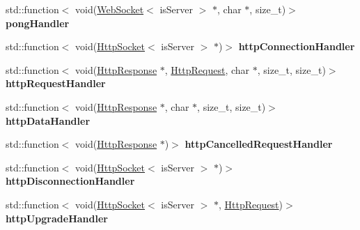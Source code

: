 \begin{DoxyCompactItemize}
\item 
\mbox{\label{structu_w_s_1_1_group_a5f782ed3edcd17723fd8a26e4b40abfd}} 
std\+::function$<$ void(\mbox{\hyperlink{structu_w_s_1_1_web_socket}{Web\+Socket}}$<$ is\+Server $>$ $\ast$, char $\ast$, size\+\_\+t)$>$ {\bfseries pong\+Handler}
\item 
\mbox{\label{structu_w_s_1_1_group_a697bf4ea6b46105c1e942d721b87e523}} 
std\+::function$<$ void(\mbox{\hyperlink{structu_w_s_1_1_http_socket}{Http\+Socket}}$<$ is\+Server $>$ $\ast$)$>$ {\bfseries http\+Connection\+Handler}
\item 
\mbox{\label{structu_w_s_1_1_group_acbaa06442c29bcd392ca748090d3eeba}} 
std\+::function$<$ void(\mbox{\hyperlink{structu_w_s_1_1_http_response}{Http\+Response}} $\ast$, \mbox{\hyperlink{structu_w_s_1_1_http_request}{Http\+Request}}, char $\ast$, size\+\_\+t, size\+\_\+t)$>$ {\bfseries http\+Request\+Handler}
\item 
\mbox{\label{structu_w_s_1_1_group_a4c3dc4b1a42a1304c2a85cea6545cc6c}} 
std\+::function$<$ void(\mbox{\hyperlink{structu_w_s_1_1_http_response}{Http\+Response}} $\ast$, char $\ast$, size\+\_\+t, size\+\_\+t)$>$ {\bfseries http\+Data\+Handler}
\item 
\mbox{\label{structu_w_s_1_1_group_ad89102f35b1381e9b098397d54d3c9d5}} 
std\+::function$<$ void(\mbox{\hyperlink{structu_w_s_1_1_http_response}{Http\+Response}} $\ast$)$>$ {\bfseries http\+Cancelled\+Request\+Handler}
\item 
\mbox{\label{structu_w_s_1_1_group_ab942aaee00970bf2cd6b6ac4ec52622e}} 
std\+::function$<$ void(\mbox{\hyperlink{structu_w_s_1_1_http_socket}{Http\+Socket}}$<$ is\+Server $>$ $\ast$)$>$ {\bfseries http\+Disconnection\+Handler}
\item 
\mbox{\label{structu_w_s_1_1_group_a64f39a31e3cafa247cc34e42c2376e9d}} 
std\+::function$<$ void(\mbox{\hyperlink{structu_w_s_1_1_http_socket}{Http\+Socket}}$<$ is\+Server $>$ $\ast$, \mbox{\hyperlink{structu_w_s_1_1_http_request}{Http\+Request}})$>$ {\bfseries http\+Upgrade\+Handler}
\item 

\end{DoxyCompactItemize}
